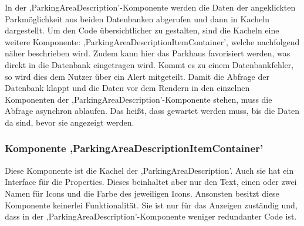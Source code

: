 In der ,ParkingAreaDescription'-Komponente werden die Daten der angeklickten Parkmöglichkeit aus beiden Datenbanken abgerufen und dann in Kacheln dargestellt. Um den Code übersichtlicher zu gestalten, sind die Kacheln eine weitere Komponente: ,ParkingAreaDescriptionItemContainer', welche nachfolgend näher beschrieben wird. Zudem kann hier das Parkhaus favorisiert werden, was direkt in die Datenbank eingetragen wird. Kommt es zu einem Datenbankfehler, so wird dies dem Nutzer über ein Alert mitgeteilt. Damit die Abfrage der Datenbank klappt und die Daten vor dem Rendern in den einzelnen Komponenten der ,ParkingAreaDescription'-Komponente stehen, muss die Abfrage asynchron ablaufen. Das heißt, dass gewartet werden muss, bis die Daten da sind, bevor sie angezeigt werden.

\subsubsection{Komponente ,ParkingAreaDescriptionItemContainer'}
\label{parkingAreaDescriptionItemContainer}
Diese Komponente ist die Kachel der ,ParkingAreaDescription'. Auch sie hat ein Interface für die Properties. Dieses beinhaltet aber nur den Text, einen oder zwei Namen für Icons und die Farbe des jeweiligen Icons. Ansonsten besitzt diese Komponente keinerlei Funktionalität. Sie ist nur für das Anzeigen zuständig und, dass in der ,ParkingAreaDescription'-Komponente weniger redundanter Code ist.

